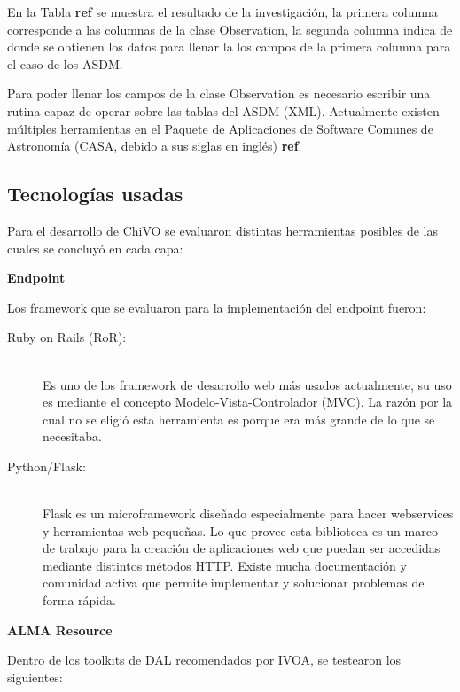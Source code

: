 En la Tabla \textbf{ref} se muestra el resultado de la investigación, la primera
columna corresponde a las columnas de la clase Observation, la segunda columna
indica de donde se obtienen los datos para llenar la los campos de la primera
columna para el caso de los ASDM.

Para poder llenar los campos de la clase Observation es necesario escribir una
rutina capaz de operar sobre las tablas del ASDM (XML).
Actualmente existen múltiples herramientas en el Paquete de Aplicaciones de Software
Comunes de Astronomía (CASA, debido a sus siglas en inglés) \textbf{ref}.

\subsection{Tecnologías usadas}

Para el desarrollo de ChiVO se evaluaron distintas herramientas posibles de las
cuales se concluyó en cada capa:

\textbf{Endpoint}

Los framework que se evaluaron para la implementación del endpoint fueron:

\begin{description}
    \item[Ruby on Rails (RoR):] \hfill \\
        Es uno de los framework de desarrollo web más usados actualmente, su uso es
        mediante el concepto Modelo-Vista-Controlador (MVC).
        La razón por la cual no se eligió esta herramienta es porque era más grande
        de lo que se necesitaba.
    \item[Python/Flask:] \hfill \\
        Flask es un microframework diseñado especialmente para hacer webservices y
        herramientas web pequeñas.
        Lo que provee esta biblioteca es un marco de trabajo para la creación de
        aplicaciones web que puedan ser accedidas mediante distintos métodos HTTP.
        Existe mucha documentación y comunidad activa que permite implementar y
        solucionar problemas de forma rápida.
\end{description}

\textbf{ALMA Resource}

Dentro de los toolkits de DAL recomendados por IVOA, se testearon los siguientes:

